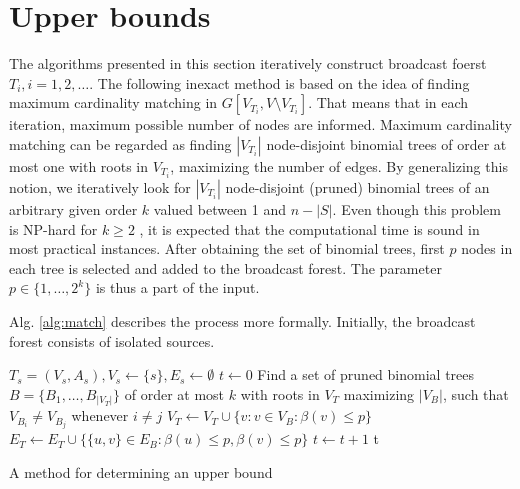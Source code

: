\section{Upper bounds}

The algorithms presented in this section iteratively construct broadcast foerst $T_i, i=1,2,\dots$.
The following inexact method is based on the idea of finding maximum cardinality matching in $G\left[V_{T_i},V\setminus V_{T_i}\right]$.
That means that in each iteration, maximum possible number of nodes are informed.
Maximum cardinality matching can be regarded as finding $|V_{T_i}|$ node-disjoint  binomial trees of order at most one with roots in $V_{T_i}$, maximizing the number of edges.
By generalizing this notion, we iteratively look for $|V_{T_i}|$ node-disjoint (pruned) binomial trees of an arbitrary given order $k$ valued between 1 and $n-|S|$.
Even though this problem is NP-hard for $k\geq 2$ \cite{jansen95}, it is expected that the computational time is sound in most practical instances.
After obtaining the set of binomial trees, first $p$ nodes in each tree is selected and added to the broadcast forest.
The parameter $p\in \{1,\dots,2^k\}$ is thus a part of the input.

Alg. \ref{alg:match} describes the process more formally.
Initially, the broadcast forest consists of isolated sources.

\begin{algorithm}[]
$T_s=(V_s,A_s), V_s\leftarrow \{s\}, E_s\leftarrow\emptyset$\;
$t\leftarrow 0$\;
 {
	Find a set of pruned binomial trees $B=\{B_1,\dots,B_{|V_T|}\}$ of order at most $k$ with roots in $V_T$ maximizing $|V_B|$, such that $V_{B_i}\neq V_{B_j}$ whenever $i\neq j$\;
	$V_T\leftarrow V_T\cup \{v:v\in V_B:\beta(v)\leq p\}$\;
	$E_T\leftarrow E_T\cup \{\{u,v\}\in E_B: \beta(u)\leq p,\beta(v)\leq p\}$\;
	$t\leftarrow t+1$\;
}
\Return t\;
 \caption{A method for determining an upper bound}
\label{alg:genub}
\end{algorithm}



